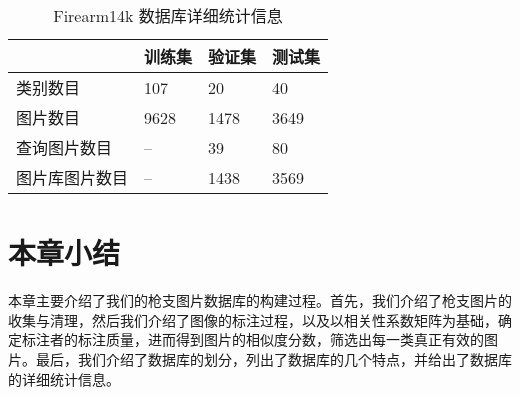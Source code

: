 \begin{table}[!t]
	\centering
	\caption[Firearm14k 数据库详细统计信息]{Firearm14k 数据库详细统计信息}
	\label{table:train_val_test_stat}
	\begin{tabular}{@{}llll@{}}
		\toprule
		          & 训练集 & 验证集 & 测试集 \\
		\midrule
		类别数目 & 107       & 20             & 40       \\
		图片数目 & 9628      & 1478           & 3649     \\
		查询图片数目 & --        & 39             & 80       \\
		图片库图片数目 & -- & 1438 &  3569 \\
		\bottomrule
	\end{tabular}
\end{table}

\section{本章小结}
本章主要介绍了我们的枪支图片数据库的构建过程。首先，我们介绍了枪支图片的收集与清理，然后我们介绍了图像的标注过程，以及以相关性系数矩阵为基础，确定标注者的标注质量，进而得到图片的相似度分数，筛选出每一类真正有效的图片。最后，我们介绍了数据库的划分，列出了数据库的几个特点，并给出了数据库的详细统计信息。




